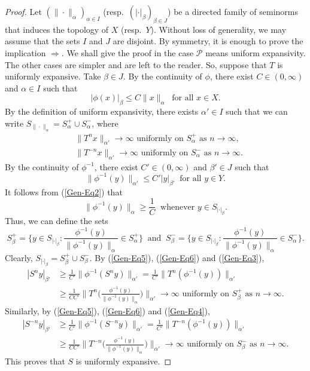 \documentclass[12pt]{amsart}
\theoremstyle{theorem}
\theoremstyle{definition}
\theoremstyle{remark} \theoremstyle{question} \theoremstyle{example}
\newcommand{\cP}{\mathcal{P}}
\begin{document}
\begin{proof}
Let $(\|\cdot\|_\alpha)_{\alpha \in I}$ (resp.\ $(|\cdot|_\beta)_{\beta \in J}$) be a directed family of seminorms 
that induces the topology of $X$ (resp.\ $Y$).
Without loss of generality, we may assume that the sets $I$ and $J$ are disjoint.
By symmetry, it is enough to prove the implication $\Rightarrow$.
We shall give the proof in the case $\cP$ means uniform expansivity. 
The other cases are simpler and are left to the reader.
So, suppose that $T$ is uniformly expansive.
Take $\beta \in J$. By the continuity of $\phi$, there exist $C \in (0,\infty)$ and $\alpha \in I$ such that
\begin{equation}\label{Gen-Eq2}
|\phi(x)|_\beta \leq C \|x\|_\alpha \ \text{ for all } x \in X.
\end{equation}
By the definition of uniform expansivity, there exists $\alpha' \in I$ such that 
we can write $S_{\|\cdot\|_\alpha} = S^+_\alpha \cup S^-_\alpha$, where
\begin{align}
&\|T^n x\|_{\alpha'} \to \infty \text{ uniformly on } S^+_\alpha \text{ as } n \to \infty, \label{Gen-Eq3} \\
&\|T^{-n} x\|_{\alpha'} \to \infty \text{ uniformly on } S^-_\alpha \text{ as } n \to \infty. \label{Gen-Eq4}
\end{align}
By the continuity of $\phi^{-1}$, there exist $C' \in (0,\infty)$ and $\beta' \in J$ such that
\begin{equation}\label{Gen-Eq5}
\|\phi^{-1}(y)\|_{\alpha'} \leq C' |y|_{\beta'} \ \text{ for all } y \in Y.
\end{equation}
It follows from (\ref{Gen-Eq2}) that
\begin{equation}\label{Gen-Eq6}
\|\phi^{-1}(y)\|_\alpha \geq \frac{1}{C} \ \text{ whenever } y \in S_{|\cdot|_\beta}.
\end{equation}
Thus, we can define the sets
\[
S^+_\beta = \Big\{y \in S_{|\cdot|_\beta} : \frac{\phi^{-1}(y)}{\|\phi^{-1}(y)\|_\alpha} \in S^+_\alpha\Big\} \ \text{ and } \
S^-_\beta = \Big\{y \in S_{|\cdot|_\beta} : \frac{\phi^{-1}(y)}{\|\phi^{-1}(y)\|_\alpha} \in S^-_\alpha\Big\}.
\]
Clearly, $S_{|\cdot|_\beta} = S^+_\beta \cup S^-_\beta$. By (\ref{Gen-Eq5}), (\ref{Gen-Eq6}) and (\ref{Gen-Eq3}),
\begin{align*}
|S^n y|_{\beta'} &\geq \frac{1}{C'} \|\phi^{-1}(S^n y)\|_{\alpha'} = \frac{1}{C'} \|T^n(\phi^{-1}(y))\|_{\alpha'}\\
  &\geq \frac{1}{C C'} \Big\|T^n\Big(\frac{\phi^{-1}(y)}{\|\phi^{-1}(y)\|_\alpha}\Big)\Big\|_{\alpha'}
  \to \infty \text{ uniformly on } S^+_\beta \text{ as } n \to \infty.
\end{align*}
Similarly, by (\ref{Gen-Eq5}), (\ref{Gen-Eq6}) and (\ref{Gen-Eq4}),
\begin{align*}
|S^{-n} y|_{\beta'} &\geq \frac{1}{C'} \|\phi^{-1}(S^{-n} y)\|_{\alpha'} = \frac{1}{C'} \|T^{-n}(\phi^{-1}(y))\|_{\alpha'}\\
  &\geq \frac{1}{C C'} \Big\|T^{-n}\Big(\frac{\phi^{-1}(y)}{\|\phi^{-1}(y)\|_\alpha}\Big)\Big\|_{\alpha'}
  \to \infty \text{ uniformly on } S^-_\beta \text{ as } n \to \infty.
\end{align*}
This proves that $S$ is uniformly expansive.
\end{proof}
\end{document}

